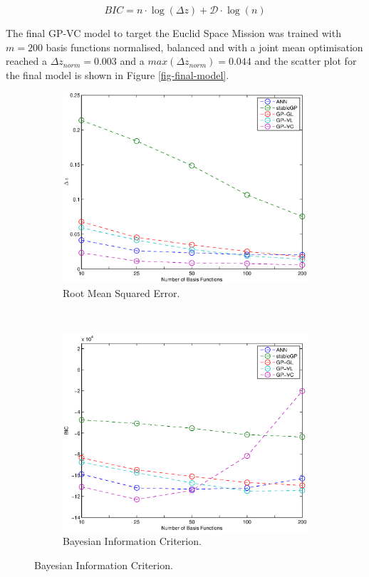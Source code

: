 \documentclass[useAMS,usenatbib,fleqn]{mn2e}
\begin{document}
\begin{equation}
\label{eq-bic}
BIC = n \cdot \log(\Delta z)+\mathcal{D}\cdot \log(n)
\end{equation}

The final GP-VC model to target the Euclid Space Mission was trained with $m=200$ basis functions normalised, balanced and with a joint mean optimisation reached a $\Delta z_{norm}=0.003$ and a  $max(\Delta z_{norm})=0.044$ and the scatter plot for the final model is shown in Figure \ref{fig-final-model}.

\begin{figure}
        \centering
        
        \begin{subfigure}[b]{0.45\textwidth}
                \includegraphics[width=\textwidth]{figures/different-basis.eps}
                 \caption{Root Mean Squared Error.}
                 \label{fig-rmses}
        \end{subfigure}
	~
       \begin{subfigure}[b]{0.45\textwidth}
                \includegraphics[width=\textwidth]{figures/BIC.eps}
                 \caption{Bayesian Information Criterion.}
                 \label{fig-bic}
        \end{subfigure}


\end{figure}
\end{document}

